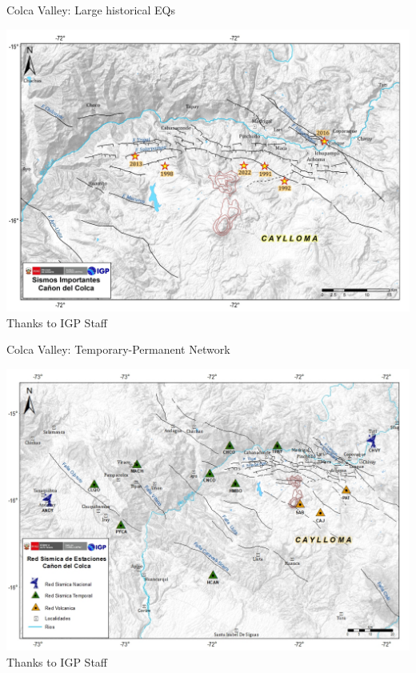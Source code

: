 \documentclass{beamer}
\begin{document}
\begin{frame}
 {Colca Valley: Large historical EQs}

 \includegraphics[width=1\linewidth]{images/red_colca_hist.jpg}  \\
 \hfill Thanks to IGP Staff

\end{frame}


\begin{frame}
 {Colca Valley: Temporary-Permanent Network}
 
 \includegraphics[width=1\linewidth]{images/red_colca.jpg} \\
 \hfill Thanks to IGP Staff
 
\end{frame}
\end{document}
